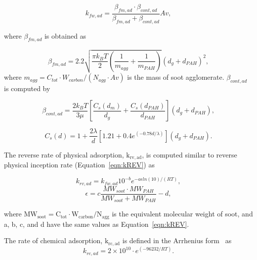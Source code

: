 \begin{equation}
	k_{fw,ad} = \frac{\beta_{fm,ad}\cdot\beta_{cont,ad}}{\beta_{fm,ad}+\beta_{cont,ad}} Av
	\label{eqn:phyad},
\end{equation}

\noindent where $\beta_{fm,ad}$ is obtained \cite{naseri2022simulating} as

\begin{equation}
	\beta_{fm,ad} = 2.2 
	\sqrt
	{
		\frac{\pi k_B T}{2}
		\left(
		\frac{1}{m_{agg}}+\frac{1}{m_{PAH}} 
		\right)
	} 
	\left( d_g + d_{PAH} \right)^2
	\label{eqn:betafmad},
\end{equation}
\noindent where $m_{agg}=C_{tot}\cdot W_{carbon}/(N_{agg}\cdot Av)$ is the mass of soot agglomerate. $\beta_{cont,ad}$ is computed by

\begin{equation}
	\beta_{cont,ad} =
	\frac{2k_BT}{3 \mu}
	\left[
	\frac{C_s(d_m)}{d_g}
	+
	\frac{C_s(d_{PAH})}{d_{PAH}}
	\right]
	\left( d_g + d_{PAH} \right)
	\label{eqn:betacontad},
\end{equation}

\begin{equation}
	C_s(d) =
	1+
	\frac{2\lambda}{d}
	\left[
	1.21 + 0.4 e^{(-0.78d/\lambda)}
	\right]
	\left( d_g + d_{PAH} \right)
	\label{eqn:cs}.
\end{equation}

The reverse rate of physical adsorption, $\mathrm{k_{rv,ad}}$, is computed similar to reverse physical inception rate (Equation~\eqref{eqn:kREV}) as

\begin{equation}
	k_{rv,ad} = k_{fw,ad}10^{-b}e^{-a\epsilon ln(10)/(RT)}
	\label{eqn:krvad},
\end{equation}
\begin{equation}
	\epsilon = c\frac{MW_{soot}\cdot MW_{PAH}}{MW_{soot} + MW_{PAH}} -d
	\label{eqn:epsilonad},
\end{equation}

\noindent where $\mathrm{MW_{soot}=C_{tot}\cdot W_{carbon} / N_{agg}}$ is the equivalent molecular weight of soot, and a, b, c, and d have the same values as Equation~\eqref{eqn:kREV}.

The rate of chemical adsorption, $\mathrm{k_{rc,ad}}$ is defined in the Arrhenius form~\cite{naseri2022simulating} as
\begin{equation}
	k_{rc,ad} = 2\times10^{10}\cdot e^{(-96232/RT)}
	\label{eqn:krcad}.
\end{equation}


